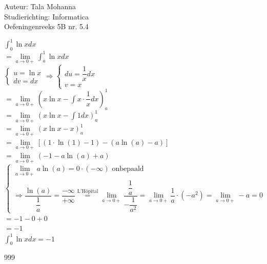 \documentclass[a4paper]{article}
\begin{document}
\noindent \large Auteur: Tala Mohanna\\
\noindent \large Studierichting: Informatica\\
\noindent \large Oefeningenreeks 5B nr. 5.4\\

\medskip

\normalsize

$ \displaystyle\int_0^1 \ln x dx $\\

$ = \lim\limits_{a \rightarrow 0+} \displaystyle\int_a^1 \ln x dx $\\

$ \left \{
\begin{array}{l}
u = \ln x \\
dv = dx
\end{array}
\right .
\Rightarrow
\left \{
\begin{array}{l}
du = \dfrac{1}{x} dx \\
v = x
\end{array}
\right . $\\

$ = \lim\limits_{a \rightarrow 0+} \left( x \ln x-\displaystyle\int x\cdot\dfrac{1}{x} dx \right)_a^1 $\\

$ = \lim\limits_{a \rightarrow 0+} \left( x \ln x-\displaystyle\int 1 dx \right)_a^1 $\\

$ = \lim\limits_{a \rightarrow 0+} \left( x \ln x-x \right)_a^1 $\\

$ = \lim\limits_{a \rightarrow 0+} \left[ (1\cdot\ln(1)-1)-(a\ln(a)-a) \right] $\\

$ = \lim\limits_{a \rightarrow 0+} (-1-a\ln(a)+a) $\\

$ \left \{
\begin{array}{l}
\lim\limits_{a \rightarrow 0+} a\ln(a) = 0\cdot (-\infty) \text{ onbepaald} \\

\Rightarrow \dfrac{\ln(a)}{\dfrac{1}{a}} = \dfrac{-\infty}{+\infty} \overset{\text{L'Hôpital}}{=} \lim\limits_{a \rightarrow 0+} \dfrac{\dfrac{1}{a}}{-\dfrac{1}{a^2}} = \lim\limits_{a \rightarrow 0+} \dfrac{1}{a}\cdot(-a^2) = \lim\limits_{a \rightarrow 0+} -a = 0
\end{array}
\right . $\\

$ = -1-0+0 $\\

$ = -1 $\\

$ \displaystyle\int_0^1 \ln x dx=-1 $

\begin{thebibliography}{999}
\end{thebibliography}
\end{document}
